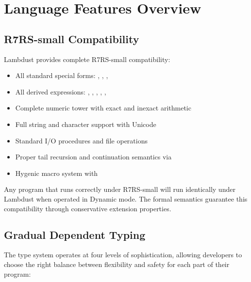 \section{Language Features Overview}
\label{sec:features}

\subsection{R7RS-small Compatibility}
\label{subsec:r7rs}

Lambdust provides complete R7RS-small compatibility:
\begin{itemize}
\item All standard special forms: , , , 
\item All derived expressions: , , , , , 
\item Complete numeric tower with exact and inexact arithmetic
\item Full string and character support with Unicode
\item Standard I/O procedures and file operations
\item Proper tail recursion and continuation semantics via 
\item Hygenic macro system with 
\end{itemize}

\begin{compatibility}[R7RS Compatibility]
Any program that runs correctly under R7RS-small will run identically under Lambdust when operated in Dynamic mode. The formal semantics guarantee this compatibility through conservative extension properties.
\end{compatibility}

\subsection{Gradual Dependent Typing}
\label{subsec:typing}

The type system operates at four levels of sophistication, allowing developers to choose the right balance between flexibility and safety for each part of their program:

